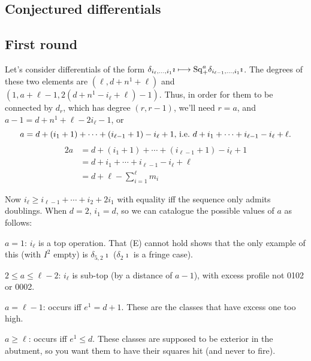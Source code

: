 \documentclass[10pt]{article}
\newcommand{\SqShift}{\Sq_{\smash{+}}}
\newcommand{\Sq}{\mathrm{Sq}}
\begin{document}
\begin{conjectured differentials}
\section{Conjectured differentials}
\subsection{First round}
Let's consider differentials of the form $\delta_{i_\ell,\ldots,i_1}\imath\mapsto \SqShift^a\delta_{i_{\ell-1},\ldots,i_1}\imath$. The degrees of these two elements are $(\ell,d+n^1+\ell)$ and $(1,a+\ell-1,2(d+n^1-i_\ell+\ell)-1)$. Thus, in order for them to be connected by $d_r$, which has degree $(r,r-1)$, we'll need $r=a$, and $a-1=d+n^1+\ell-2i_\ell-1$, or
\[a=d+(i_1+1)+\cdots +(i_{\ell-1}+1)-i_\ell+1\textup{, i.e.\ }d+i_1+\cdots +i_{\ell-1}-i_\ell+\ell.\]
\begin{alignat*}{2}
a
&=
d+(i_1+1)+\cdots +(i_{\ell-1}+1)-i_\ell+1%
\\
&=
d+i_1+\cdots +i_{\ell-1}-i_\ell+\ell\\
&=
d+\ell-\textstyle\sum_{i=1}^\ell m_i%
\end{alignat*}

Now $i_\ell\geq i_{\ell-1}+\cdots +i_2+2i_1$ with equality iff the sequence only admits doublings. When $d=2$, $i_1=d$, so we can catalogue the possible values of $a$ as follows:
\begin{itemise}
\setlength{\parindent}{.25in}
\item $a=1$: $i_\ell$ is a top operation. That (E) cannot hold shows that the only example of this (with $I^2$ empty) is $\delta_{5,2}\imath$ ($\delta_{2}\imath$ is a fringe case).
\item $2\leq a\leq\ell-2$: $i_\ell$ is sub-top (by a distance of $a-1$), with excess profile not 0102 or 0002.
\item $a=\ell-1$: occurs iff $e^1=d+1$. These are the classes that have excess one too high.
\item $a\geq\ell$:  occurs iff $e^1\leq d$. These classes are supposed to be exterior in the abutment, so you want them to have their squares hit (and never to fire).


\end{itemise}
\end{conjectured differentials}
\end{document}
